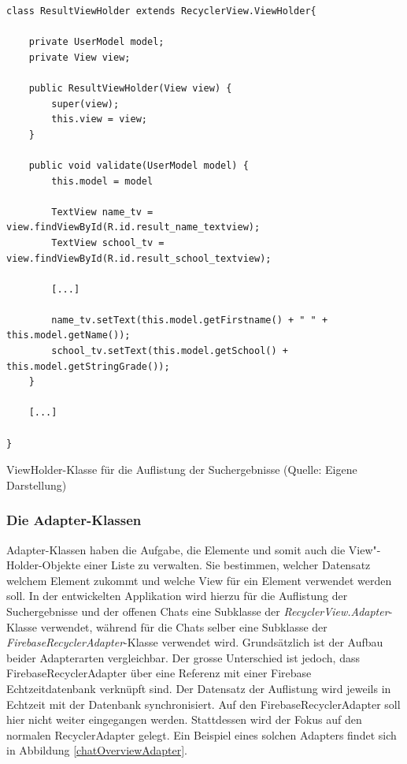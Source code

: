 \documentclass[../main.tex]{subfiles}
\begin{document}
\begin{code}
	\begin{center}
		\begin{verbatim}
class ResultViewHolder extends RecyclerView.ViewHolder{
	
	private UserModel model;
	private View view;
	
	public ResultViewHolder(View view) {
		super(view);
		this.view = view;
	}
	
	public void validate(UserModel model) {
		this.model = model
	
		TextView name_tv = view.findViewById(R.id.result_name_textview);
		TextView school_tv = view.findViewById(R.id.result_school_textview);
		
		[...]
		
		name_tv.setText(this.model.getFirstname() + " " + this.model.getName());
		school_tv.setText(this.model.getSchool() + this.model.getStringGrade());
	}
	
	[...]
	
}
		\end{verbatim}
		\caption{ViewHolder-Klasse für die Auflistung der Suchergebnisse (Quelle: Eigene Darstellung)}
		\label{viewHolder}
	\end{center}
\end{code}

	
	\subsubsection{Die Adapter-Klassen}
	Adapter-Klassen haben die Aufgabe, die Elemente und somit auch die View"-Holder-Objekte einer Liste zu verwalten. Sie bestimmen, welcher Datensatz welchem Element zukommt und welche View für ein Element verwendet werden soll. In der entwickelten Applikation wird hierzu für die Auflistung der Suchergebnisse und der offenen Chats eine Subklasse der \emph{RecyclerView.Adapter}-Klasse verwendet, während für die Chats selber eine Subklasse der \emph{FirebaseRecyclerAdapter}-Klasse verwendet wird. Grundsätzlich ist der Aufbau beider Adapterarten vergleichbar. Der grosse Unterschied ist jedoch, dass FirebaseRecyclerAdapter über eine Referenz mit einer Firebase Echtzeitdatenbank verknüpft sind. Der Datensatz der Auflistung wird jeweils in Echtzeit mit der Datenbank synchronisiert. Auf den FirebaseRecyclerAdapter soll hier nicht weiter eingegangen werden. Stattdessen wird der Fokus auf den normalen RecyclerAdapter gelegt. Ein Beispiel eines solchen Adapters findet sich in Abbildung \ref{chatOverviewAdapter}.
	
\end{document}
